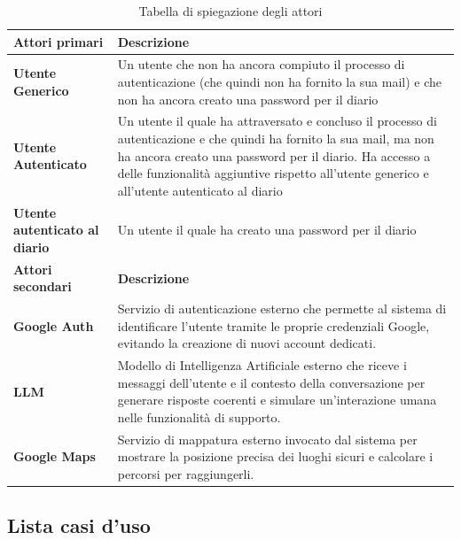 \documentclass[a4paper,12pt]{article}
\begin{document}
\begin{center}
\small
{}
\begin{longtable}{|p{}|p{}|}
\caption{Tabella di spiegazione degli attori} \label{tab:attori} \\
\hline
\rowcolor{gray!70}
\centering \textbf{Attori primari} & \centering \textbf{Descrizione} \tabularnewline
\hline
\endfirsthead
\hline
\endhead
\rowcolor{white}
\centering \textbf{Utente Generico} & Un utente che non ha ancora compiuto il processo di autenticazione (che quindi non ha fornito la sua mail) e che non ha ancora creato una password per il diario \\
\hline
\rowcolor{gray!20}
\centering \textbf{Utente Autenticato} & Un utente il quale ha attraversato e concluso il processo di autenticazione e che quindi ha fornito la sua mail, ma non ha ancora creato una password per il diario. Ha accesso a delle funzionalità aggiuntive rispetto all'utente generico e all'utente autenticato al diario \\
\hline
\rowcolor{white}
\centering \textbf{Utente autenticato al diario} & Un utente il quale ha creato una password per il diario \\
\hline
\rowcolor{gray!70}
\centering \textbf{Attori secondari} & \centering \textbf{Descrizione} \tabularnewline
\hline
\rowcolor{white}
\centering \textbf{Google Auth} & Servizio di autenticazione esterno che permette al sistema di identificare l'utente tramite le proprie credenziali Google, evitando la creazione di nuovi account dedicati. \\
\hline
\rowcolor{gray!20}
\centering \textbf{LLM} & Modello di Intelligenza Artificiale esterno che riceve i messaggi dell'utente e il contesto della conversazione per generare risposte coerenti e simulare un'interazione umana nelle funzionalità di supporto. \\
\hline
\rowcolor{white}
\centering \textbf{Google Maps} & Servizio di mappatura esterno invocato dal sistema per mostrare la posizione precisa dei luoghi sicuri e calcolare i percorsi per raggiungerli. \\
\hline
\end{longtable}
\end{center}


\subsection{Lista casi d'uso}
\end{document}
